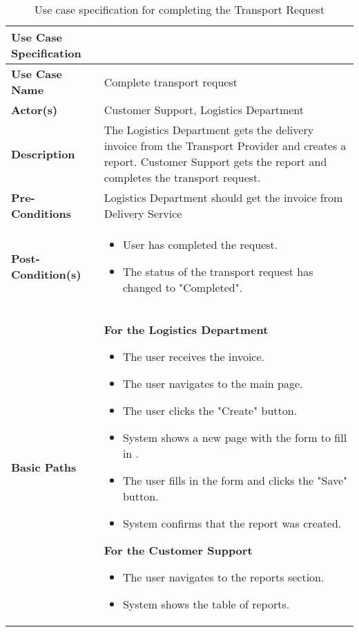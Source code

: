 \documentclass[a4paper]{article}
\begin{document}
     \begin{longtable}{|p{}|p{}|}
        \caption{Use case specification for completing the Transport Request}
        \label{completeTheTransportRequestUseCase} \\
        \hline
        Use Case Specification  &  \\
         \hline
         \endhead
         \textbf{Use Case Name} & Complete transport request \\
         \hline
         \textbf{Actor(s)} & Customer Support, Logistics Department \\
         \hline
         \textbf{Description} & The Logistics Department gets the delivery invoice from the Transport Provider and creates a report. Customer Support gets the report and completes the transport request. \\
         \hline
         \textbf{Pre-Conditions} & Logistics Department should get the invoice from Delivery Service \\
         \hline
        \textbf{Post-Condition(s)} & 
        \begin{itemize}
            \item User has completed the request.
            \item The status of the transport request has changed to "Completed".
        \end{itemize} \\
         \hline
         \textbf{Basic Paths} & \textbf{For the Logistics Department}
         \begin{itemize}
             \item The user receives the invoice. 
             \item The user navigates to the main page.
             \item The user clicks the "Create" button.
             \item System shows a new page with the form to fill in .
             \item The user fills in the form and clicks the "Save" button.
             \item System confirms that the report was created.
         \end{itemize} 
         \textbf{For the Customer Support}
         \begin{itemize}
            \item The user navigates to the reports section.
             \item System shows the table of reports.

\end{itemize}
\end{longtable}
\end{document}

